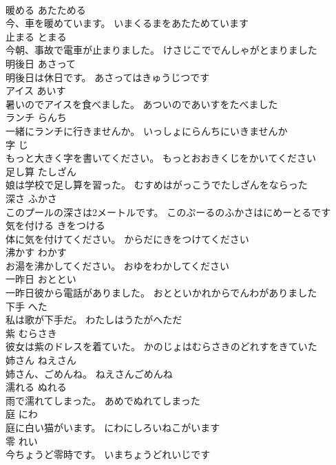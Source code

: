 \documentclass[8pt]{extreport}
\begin{document}
\begin{CJK}{UTF8}{min}
\\	暖める	あたためる	
\\	今、車を暖めています。	いまくるまをあたためています	
\\	止まる	とまる	
\\	今朝、事故で電車が止まりました。	けさじこででんしゃがとまりました	
\\	明後日	あさって	
\\	明後日は休日です。	あさってはきゅうじつです	
\\	アイス	あいす	
\\	暑いのでアイスを食べました。	あついのであいすをたべました	
\\	ランチ	らんち	
\\	一緒にランチに行きませんか。	いっしょにらんちにいきませんか	
\\	字	じ	
\\	もっと大きく字を書いてください。	もっとおおきくじをかいてください	
\\	足し算	たしざん	
\\	娘は学校で足し算を習った。	むすめはがっこうでたしざんをならった	
\\	深さ	ふかさ	
\\	このプールの深さは2メートルです。	このぷーるのふかさはにめーとるです	
\\	気を付ける	きをつける	
\\	体に気を付けてください。	からだにきをつけてください	
\\	沸かす	わかす	
\\	お湯を沸かしてください。	おゆをわかしてください	
\\	一昨日	おととい	
\\	一昨日彼から電話がありました。	おとといかれからでんわがありました	
\\	下手	へた	
\\	私は歌が下手だ。	わたしはうたがへただ	
\\	紫	むらさき	
\\	彼女は紫のドレスを着ていた。	かのじょはむらさきのどれすをきていた	
\\	姉さん	ねえさん	
\\	姉さん、ごめんね。	ねえさんごめんね	
\\	濡れる	ぬれる	
\\	雨で濡れてしまった。	あめでぬれてしまった	
\\	庭	にわ	
\\	庭に白い猫がいます。	にわにしろいねこがいます	
\\	零	れい	
\\	今ちょうど零時です。	いまちょうどれいじです	

\end{CJK}
\end{document}
